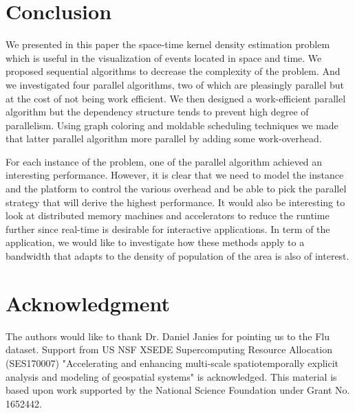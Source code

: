 \documentclass[10pt, conference, compsocconf]{IEEEtran}
\begin{document}
\section{Conclusion}

We presented in this paper the space-time kernel density estimation
problem which is useful in the visualization of events located in
space and time. We proposed sequential algorithms to decrease the
complexity of the problem. And we investigated four parallel
algorithms, two of which are pleasingly parallel but at the cost of
not being work efficient. We then designed a work-efficient parallel
algorithm but the dependency structure tends to prevent high degree of
parallelism. Using graph coloring and moldable scheduling techniques
we made that latter parallel algorithm more parallel by adding some
work-overhead.

For each instance of the problem, one of the parallel algorithm
achieved an interesting performance. However, it is clear that we need
to model the instance and the platform to control the various overhead
and be able to pick the parallel strategy that will derive the highest
performance. It would also be interesting to look at distributed
memory machines and accelerators to reduce the runtime further since
real-time is desirable for interactive applications. In term of the
application, we would like to investigate how these methods apply to a
bandwidth that adapts to the density of population of the area is also
of interest.

\section*{Acknowledgment}

The authors would like to thank Dr. Daniel Janies for pointing us to
the Flu dataset.
%
Support from US NSF XSEDE Supercomputing Resource Allocation
(SES170007) "Accelerating and enhancing multi-scale spatiotemporally
explicit analysis and modeling of geospatial systems" is acknowledged.
%
This material is based upon work supported by the National Science Foundation under Grant No. 1652442.




\end{document}
